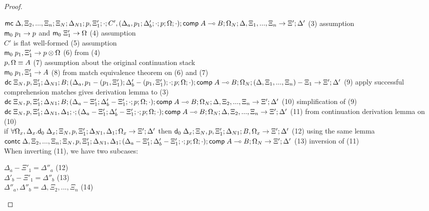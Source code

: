 \begin{proof}
\begin{itemize}
      $\mathsf{mc} \; \Delta, \Xi_2, ..., \Xi_n; \Xi_N; \Delta_{N1}; p, \Xi'_1; \cdot; C', (\Delta_a, p_1; \Delta'_b; \cdot; p; \Omega; \cdot); \mathsf{comp} \; A \multimap B; \Omega_N; \Delta, \Xi_1, ..., \Xi_n \rightarrow \Xi'; \Delta'$ \hfill (3) assumption \\
      $\mathsf{m}_0 \; p_1 \rightarrow p$ and $\mathsf{m}_0 \; \Xi'_1 \rightarrow \Omega$ \hfill (4) assumption \\
      $C'$ is flat well-formed \hfill (5) assumption \\
      $\mathsf{m}_0 \; p_1, \Xi'_1 \rightarrow p \otimes \Omega$ \hfill (6) from (4) \\
      $p, \Omega \equiv A$ \hfill (7) assumption about the original continuation stack \\
      $\mathsf{m}_0 \; p_1, \Xi'_1 \rightarrow A$ \hfill (8) from match equivalence theorem on (6) and (7) \\
      $\mathsf{dc} \; \Xi_N, p, \Xi'_1; \Delta_{N1}; B; (\Delta_a, p_1 - (p_1, \Xi'_1); \Delta'_b - (p_1, \Xi'_1); \cdot; p; \Omega; \cdot); \mathsf{comp} \; A \multimap B; \Omega_N; (\Delta, \Xi_1, ..., \Xi_n) - \Xi_1 \rightarrow \Xi'; \Delta'$ \hfill (9) apply successful comprehension matches gives derivation lemma to (3) \\
      $\mathsf{dc} \; \Xi_N, p, \Xi'_1; \Delta_{N1}; B; (\Delta_a - \Xi'_1; \Delta'_b - \Xi'_1; \cdot; p; \Omega; \cdot); \mathsf{comp} \; A \multimap B; \Omega_N; \Delta, \Xi_2, ..., \Xi_n \rightarrow \Xi'; \Delta'$ \hfill (10) simplification of (9) \\
      $\mathsf{dc} \; \Xi_N, p, \Xi'_1; \Delta_{N1}, \Delta_1; \cdot; (\Delta_a - \Xi'_1; \Delta'_b - \Xi'_1; \cdot; p; \Omega; \cdot); \mathsf{comp} \; A \multimap B; \Omega_N; \Delta, \Xi_2, ..., \Xi_n \rightarrow \Xi'; \Delta'$ \hfill (11) from continuation derivation lemma on (10)\\
      if $\forall \Omega_x, \Delta_x. \mathsf{d}_0 \; \Delta_x; \Xi_N, p, \Xi'_1; \Delta_{N1}, \Delta_1; \Omega_x \rightarrow \Xi'; \Delta'$ then $\mathsf{d}_0 \; \Delta_x; \Xi_N, p, \Xi'_1; \Delta_{N1}; B, \Omega_x \rightarrow \Xi'; \Delta'$ \hfill (12) using the same lemma \\
      $\mathsf{contc} \; \Delta, \Xi_2, ..., \Xi_n; \Xi_N, p, \Xi'_1; \Delta_{N1}, \Delta_1; (\Delta_a - \Xi'_1; \Delta'_b - \Xi'_1; \cdot; p; \Omega; \cdot); \mathsf{comp} \; A \multimap B; \Omega_N \rightarrow \Xi'; \Delta'$ \hfill (13) inversion of (11) \\   
      
      When inverting (11), we have two subcases:
      
      $\Delta_a - \Xi'_1 = \Delta''_a$ \hfill (12) \\
      $\Delta'_b - \Xi'_1 = \Delta''_b$ \hfill (13) \\
      $\Delta''_a, \Delta''_b = \Delta, \Xi_2, ..., \Xi_n$ \hfill (14) \\
      

\end{itemize}
\end{proof}

